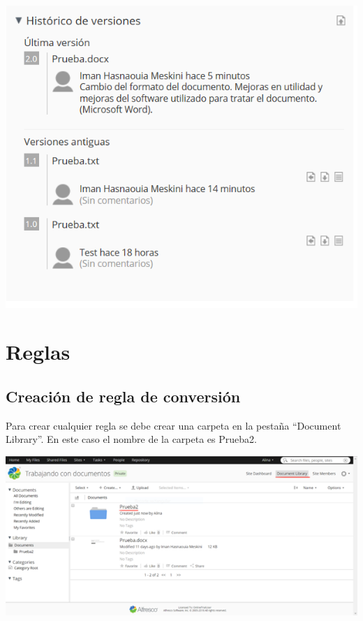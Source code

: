 \documentclass{article}
\begin{document}
\begin{center}
\includegraphics[scale=0.5]{images/versiones.png}
\end{center}

\section{Reglas}

\subsection{Creación de regla de conversión}

Para crear cualquier regla se debe crear una carpeta en la pestaña “Document Library”.  En este caso el nombre de la carpeta es Prueba2.

\begin{center}
\includegraphics[scale=0.7]{images/regla1.png}
\end{center}
\end{document}
